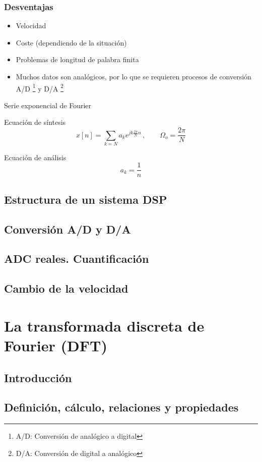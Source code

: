 \documentclass[a4paper]{book}
\begin{document}
\subsection{Desventajas}
\begin{itemize}
	 \item Velocidad
	 \item Coste (dependiendo de la situación)
	 \item Problemas de longitud de palabra finita
	 \item Muchos datos son analógicos, por lo que se requieren procesos de conversión A/D \footnote{A/D: Conversión de analógico a digital} y D/A \footnote{D/A: Conversión de digital a analógico}
\end{itemize}

Serie exponencial de Fourier

Ecuación de síntesis
\[ \boxed{x[n] = \sum_{k=N}^{}a_ke^{jk \frac{2\pi}{N} n}} \, , \qquad \Omega_o = \frac{2\pi}{N} \]

Ecuación de análisis
\[ a_k = \frac{1}{n}  \]

\section{Estructura de un sistema DSP}

\section{Conversión A/D y D/A}

\section{ADC reales. Cuantificación}

\section{Cambio de la velocidad}


\chapter{La transformada discreta de Fourier (DFT)}

\section{Introducción}

\section{Definición, cálculo, relaciones y propiedades}
\end{document}
